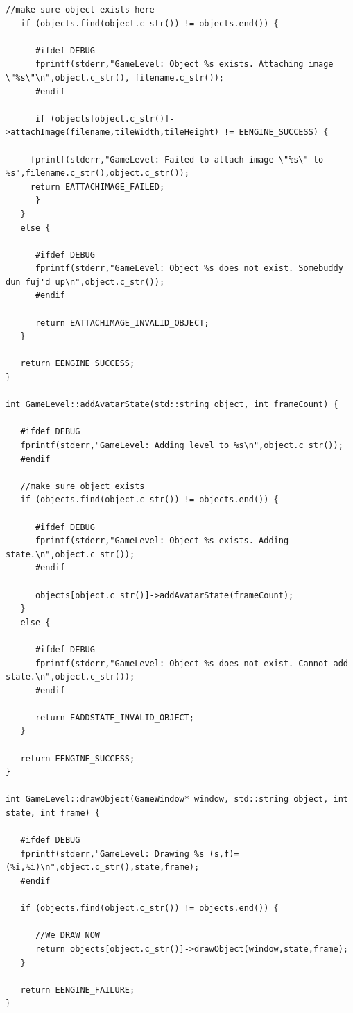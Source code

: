 \documentclass[12pt]{article}
\begin{document}
\begin{lstlisting}[breaklines]
   //make sure object exists here
   if (objects.find(object.c_str()) != objects.end()) {
      
      #ifdef DEBUG
      fprintf(stderr,"GameLevel: Object %s exists. Attaching image \"%s\"\n",object.c_str(), filename.c_str());
      #endif
      
      if (objects[object.c_str()]->attachImage(filename,tileWidth,tileHeight) != EENGINE_SUCCESS) {
	 
	 fprintf(stderr,"GameLevel: Failed to attach image \"%s\" to %s",filename.c_str(),object.c_str());
	 return EATTACHIMAGE_FAILED;
      }
   }
   else {

      #ifdef DEBUG
      fprintf(stderr,"GameLevel: Object %s does not exist. Somebuddy dun fuj'd up\n",object.c_str());
      #endif
      
      return EATTACHIMAGE_INVALID_OBJECT;
   }
   
   return EENGINE_SUCCESS;
}

int GameLevel::addAvatarState(std::string object, int frameCount) {
   
   #ifdef DEBUG
   fprintf(stderr,"GameLevel: Adding level to %s\n",object.c_str());
   #endif
   
   //make sure object exists
   if (objects.find(object.c_str()) != objects.end()) {
      
      #ifdef DEBUG
      fprintf(stderr,"GameLevel: Object %s exists. Adding state.\n",object.c_str());
      #endif
      
      objects[object.c_str()]->addAvatarState(frameCount);
   }
   else {
      
      #ifdef DEBUG
      fprintf(stderr,"GameLevel: Object %s does not exist. Cannot add state.\n",object.c_str());
      #endif
      
      return EADDSTATE_INVALID_OBJECT;
   }
   
   return EENGINE_SUCCESS;
}

int GameLevel::drawObject(GameWindow* window, std::string object, int state, int frame) {
   
   #ifdef DEBUG
   fprintf(stderr,"GameLevel: Drawing %s (s,f)=(%i,%i)\n",object.c_str(),state,frame);
   #endif

   if (objects.find(object.c_str()) != objects.end()) {
      
      //We DRAW NOW
      return objects[object.c_str()]->drawObject(window,state,frame);
   }
   
   return EENGINE_FAILURE;
}


\end{lstlisting}
\end{document}
